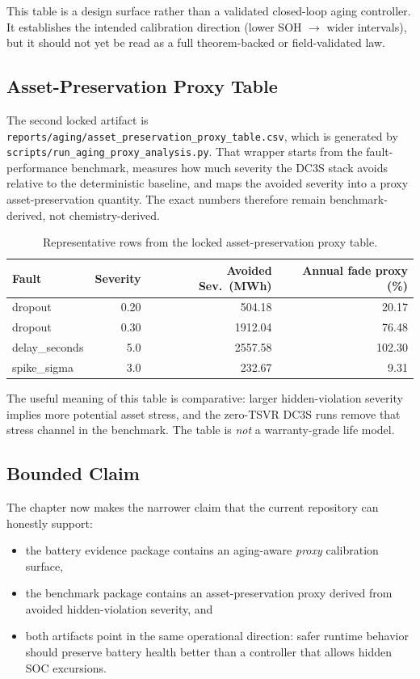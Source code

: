 This table is a design surface rather than a validated closed-loop aging
controller.  It establishes the intended calibration direction
(lower SOH $\rightarrow$ wider intervals), but it should not yet be read as a
full theorem-backed or field-validated law.

\subsection{Asset-Preservation Proxy Table}

The second locked artifact is
\texttt{reports/aging/asset\_preservation\_proxy\_table.csv}, which is
generated by \texttt{scripts/run\_aging\_proxy\_analysis.py}.  That wrapper
starts from the fault-performance benchmark, measures how much severity the
DC3S stack avoids relative to the deterministic baseline, and maps the
avoided severity into a proxy asset-preservation quantity.  The exact
numbers therefore remain benchmark-derived, not chemistry-derived.

\begin{table}[ht]
\centering
\caption{Representative rows from the locked asset-preservation proxy table.}
\label{tab:asset-preservation-proxy}
\begin{tabular}{lrrr}
\toprule
\textbf{Fault} & \textbf{Severity} & \textbf{Avoided Sev.\ (MWh)} &
  \textbf{Annual fade proxy (\%)} \\
\midrule
dropout & 0.20 & 504.18 & 20.17 \\
dropout & 0.30 & 1912.04 & 76.48 \\
delay\_seconds & 5.0 & 2557.58 & 102.30 \\
spike\_sigma & 3.0 & 232.67 & 9.31 \\
\bottomrule
\end{tabular}
\end{table}

The useful meaning of this table is comparative: larger hidden-violation
severity implies more potential asset stress, and the zero-TSVR DC3S runs
remove that stress channel in the benchmark.  The table is \emph{not} a
warranty-grade life model.

\subsection{Bounded Claim}

The chapter now makes the narrower claim that the current repository can
honestly support:

\begin{itemize}
  \item the battery evidence package contains an aging-aware \emph{proxy}
    calibration surface,
  \item the benchmark package contains an asset-preservation proxy derived
    from avoided hidden-violation severity, and
  \item both artifacts point in the same operational direction: safer
    runtime behavior should preserve battery health better than a controller
    that allows hidden SOC excursions.
\end{itemize}

